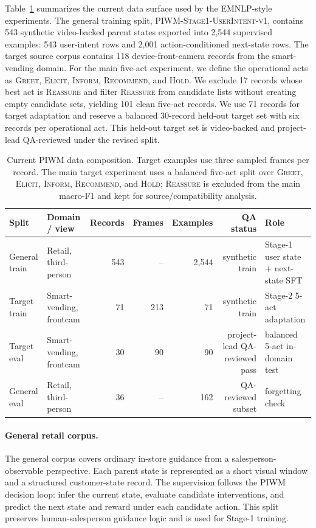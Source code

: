 Table~\ref{tab:data-composition} summarizes the current data surface used by the EMNLP-style experiments. The general training split, \textsc{PIWM-Stage1-UserIntent-v1}, contains 543 synthetic video-backed parent states exported into 2,544 supervised examples: 543 user-intent rows and 2,001 action-conditioned next-state rows. The target source corpus contains 118 device-front-camera records from the smart-vending domain. For the main five-act experiment, we define the operational acts as \textsc{Greet}, \textsc{Elicit}, \textsc{Inform}, \textsc{Recommend}, and \textsc{Hold}. We exclude 17 records whose best act is \textsc{Reassure} and filter \textsc{Reassure} from candidate lists without creating empty candidate sets, yielding 101 clean five-act records. We use 71 records for target adaptation and reserve a balanced 30-record held-out target set with six records per operational act. This held-out target set is video-backed and project-lead QA-reviewed under the revised split.

\begin{table}[t]
\centering
\small
\begin{tabular}{llrrrrl}
\toprule
Split & Domain / view & Records & Frames & Examples & QA status & Role \\
\midrule
General train & Retail, third-person & 543 & -- & 2,544 & synthetic train & Stage-1 user state + next-state SFT \\
Target train & Smart-vending, frontcam & 71 & 213 & 71 & synthetic train & Stage-2 5-act adaptation \\
Target eval & Smart-vending, frontcam & 30 & 90 & 90 & project-lead QA-reviewed pass & balanced 5-act in-domain test \\
General eval & Retail, third-person & 36 & -- & 162 & QA-reviewed subset & forgetting check \\
\bottomrule
\end{tabular}
\caption{Current PIWM data composition. Target examples use three sampled frames per record. The main target experiment uses a balanced five-act split over \textsc{Greet}, \textsc{Elicit}, \textsc{Inform}, \textsc{Recommend}, and \textsc{Hold}; \textsc{Reassure} is excluded from the main macro-F1 and kept for source/compatibility analysis.}
\label{tab:data-composition}
\end{table}

\paragraph{General retail corpus.}
The general corpus covers ordinary in-store guidance from a salesperson-observable perspective. Each parent state is represented as a short visual window and a structured customer-state record. The supervision follows the PIWM decision loop: infer the current state, evaluate candidate interventions, and predict the next state and reward under each candidate action. This split preserves human-salesperson guidance logic and is used for Stage-1 training.

